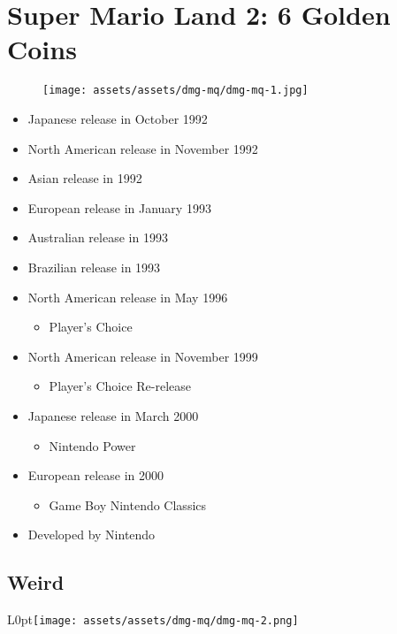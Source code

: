 \documentclass{book}
\begin{document}
\chapter*{Super Mario Land 2: 6 Golden Coins}
\vspace{\baselineskip}\begin{figure}[H]{\texttt{[image: assets/assets/dmg-mq/dmg-mq-1.jpg]}}\end{figure}\vspace{\baselineskip}
\begin{itemize}[left=0pt, nosep]
\item Japanese release in October 1992
\item North American release in November 1992
\item Asian release in 1992
\item European release in January 1993
\item Australian release in 1993
\item Brazilian release in 1993
\item North American release in May 1996
\begin{itemize}
\item Player’s Choice
\end{itemize}
\item North American release in November 1999
\begin{itemize}
\item Player’s Choice Re-release
\end{itemize}
\item Japanese release in March 2000
\begin{itemize}
\item Nintendo Power
\end{itemize}
\item European release in 2000
\begin{itemize}
\item Game Boy Nintendo Classics
\end{itemize}
\item Developed by Nintendo

\end{itemize}
\newpage\FloatBarrier\section*{Weird}
\begin{wrapfigure}{L}{0pt}{\texttt{[image: assets/assets/dmg-mq/dmg-mq-2.png]}}\end{wrapfigure}\noindent
\end{document}
